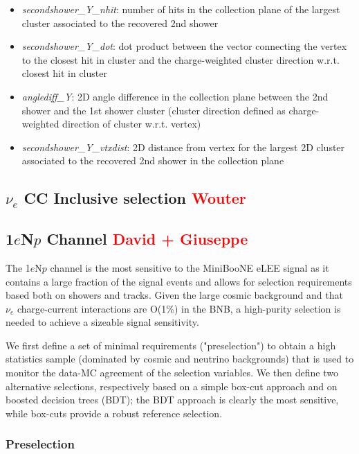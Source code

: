 \documentclass[a4paper]{article}
\begin{document}
\begin{itemize}
    \item \emph{secondshower\_Y\_nhit}: number of hits in the collection plane of the largest cluster associated to the  recovered 2nd shower
    \item \emph{secondshower\_Y\_dot}: dot product between the vector connecting the vertex to the closest hit in cluster and the charge-weighted cluster direction w.r.t. closest hit in cluster
    \item \emph{anglediff\_Y}: 2D angle difference in the collection plane between the 2nd shower and the 1st shower cluster  (cluster direction defined as charge-weighted direction of cluster w.r.t. vertex)
    \item \emph{secondshower\_Y\_vtxdist}: 2D distance from vertex for the largest 2D cluster associated to the  recovered 2nd shower in the collection plane
\end{itemize}

\clearpage
\subsection{$\nu_e$ CC Inclusive selection \textcolor{red}{Wouter}}

\clearpage

\subsection{1$e$N$p$ Channel \textcolor{red}{David + Giuseppe}}
\label{sec:nueselection:1eNp}

The 1$e$N$p$ channel is the most sensitive to the MiniBooNE eLEE signal as it contains a large fraction of the signal events and allows for selection requirements based both on showers and tracks. 
Given the large cosmic background and that $\nu_e$ charge-current interactions are O(1\%) in the BNB, a high-purity selection is needed to achieve a sizeable signal sensitivity. 

We first define a set of minimal requirements ("preselection") to obtain a high statistics sample (dominated by cosmic and neutrino backgrounds) that is used to monitor the data-MC agreement of the selection variables. 
We then define two alternative selections, respectively based on a simple box-cut approach and on boosted decision trees (BDT); the BDT approach is clearly the most sensitive, while box-cuts provide a robust reference selection.

\subsubsection{Preselection}
\end{document}
